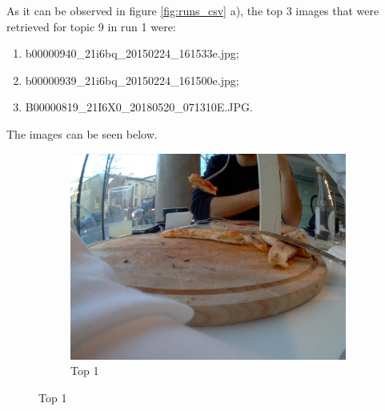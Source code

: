 As it can be observed in figure \ref{fig:runs_csv} a), the top 3 images that were retrieved for topic 9 in run 1 were:
\begin{enumerate}
  \itemsep0em
  \item b00000940\_21i6bq\_20150224\_161533e.jpg;
  \item b00000939\_21i6bq\_20150224\_161500e.jpg;
  \item B00000819\_21I6X0\_20180520\_071310E.JPG.
\end{enumerate}
 
The images can be seen below.

\begin{figure}[H]
  \centering
  \captionsetup{justification=centering}

  \begin{subfigure}{0.32\textwidth}
  \includegraphics[width=\textwidth]{Sections/7Results/images/top1.jpg} 
  \caption{Top 1}


\end{subfigure}
\end{figure}
